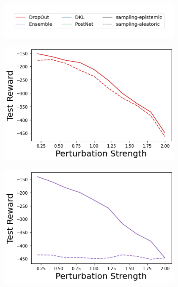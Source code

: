\begin{figure}
    \centering
        \vspace{-3mm}
    \begin{subfigure}{.45\textwidth}
        \includegraphics[width=\textwidth]{sections/011_icml2022/resources/sampling-legend.png}
    \end{subfigure}
    \vspace{-3mm}

    \begin{subfigure}{.24\textwidth}
        \includegraphics[width=\textwidth]{sections/011_icml2022/resources/action_shift-DropOut-AcrobotShift-v0-mean_reward_.png}
    \end{subfigure}
    \begin{subfigure}{.24\textwidth}
        \includegraphics[width=\textwidth]{sections/011_icml2022/resources/action_shift-Ensemble-AcrobotShift-v0-mean_reward_.png}

\end{subfigure}
\end{figure}
